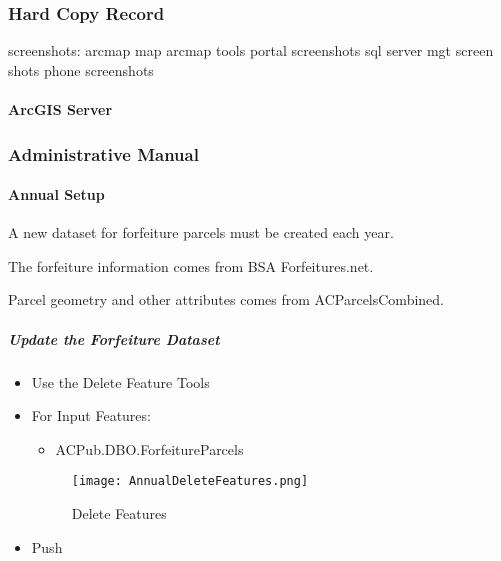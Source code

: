  \subsubsection{Hard Copy Record}
 screenshots:
 arcmap map
 arcmap tools
 portal screenshots
 sql server mgt screen shots
 phone screenshots
 \paragraph{ArcGIS Server}
 \clearpage
 \subsubsection{Administrative Manual}
 \vspace{.25in}

 \paragraph{Annual Setup}

 A new dataset for forfeiture parcels must be created each year.
 \vspace{.1in}

 \noindent The forfeiture information comes from BSA Forfeitures.net.
 \vspace{.1in}

 \noindent Parcel geometry and other attributes comes from ACParcelsCombined.
 \vspace{.25in}

 \subparagraph{Update the Forfeiture Dataset}

 \vspace{.15in}

 \begin{itemize}
 \item {\Large Use the Delete Feature Tools}
 \item {\Large For Input Features:}
 \begin{itemize}
 \item {\Large ACPub.DBO.ForfeitureParcels}
 \end{itemize}

 \vspace{.1in}

 \begin{figure}[h!]
 \centering
     \texttt{[image: AnnualDeleteFeatures.png]}
 \caption{Delete Features}
 \end{figure}
 \vspace{.15in}

 \item {\Large Push }
 \end{itemize}
 \clearpage
